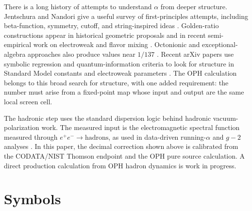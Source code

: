 \documentclass[11pt]{article}
\theoremstyle{remark}
\begin{document}
There is a long history of attempts to understand \(\alpha\) from deeper structure. Jentschura and Nandori give a useful survey of first-principles attempts, including beta-function, symmetry, cutoff, and string-inspired ideas \cite{jentschura-nandori}. Golden-ratio constructions appear in historical geometric proposals \cite{heyrovska-narayan} and in recent semi-empirical work on electroweak and flavor mixing \cite{ciborowski}. Octonionic and exceptional-algebra approaches also produce values near \(1/137\) \cite{singh}. Recent arXiv papers use symbolic regression and quantum-information criteria to look for structure in Standard Model constants and electroweak parameters \cite{chekanov-kjellerstrand,liu-low-yin}. The OPH calculation belongs to this broad search for structure, with one added requirement: the number must arise from a fixed-point map whose input and output are the same local screen cell.

The hadronic step uses the standard dispersion logic behind hadronic vacuum-polarization work. The measured input is the electromagnetic spectral function measured through \(e^+e^-\to\mathrm{hadrons}\), as used in data-driven running-\(\alpha\) and \(g-2\) analyses \cite{dhmz,knt19,pdg-xsect}. In this paper, the decimal correction shown above is calibrated from the CODATA/NIST Thomson endpoint and the OPH pure source calculation. A direct production calculation from OPH hadron dynamics is work in progress.

\section{Symbols}
\end{document}
